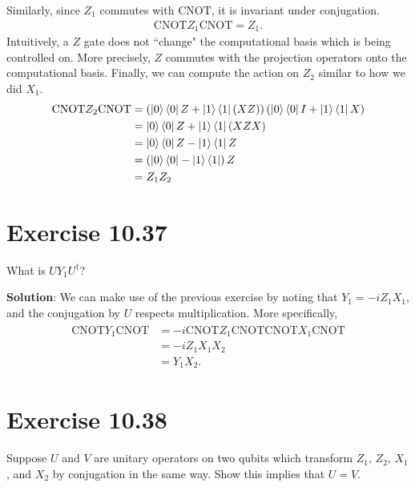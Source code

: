 \documentclass{book}
\begin{document}
    Similarly, since $Z_1$ commutes with $\mathrm{CNOT}$, it is invariant under conjugation.
    \begin{align}
        \mathrm{CNOT} Z_1 \mathrm{CNOT} = Z_1.
    \end{align}
    Intuitively, a $Z$ gate does not ``change" the computational basis which is being controlled on. More precisely, $Z$ commutes with the projection operators onto the computational basis. Finally, we can compute the action on $Z_2$ similar to how we did $X_1$.
    \begin{align}
    \begin{aligned}
        \mathrm{CNOT} Z_2 \mathrm{CNOT} &= \left(\ket{0}\bra{0}Z + \ket{1}\bra{1}(XZ)\right)\left(\ket{0}\bra{0}I + \ket{1}\bra{1}X\right) \\
        &= \ket{0}\bra{0}Z + \ket{1}\bra{1}(XZX) \\
        &= \ket{0}\bra{0}Z -\ket{1}\bra{1}Z \\
        &= \left(\ket{0}\bra{0}-\ket{1}\bra{1}\right) Z \\
        &= Z_1 Z_2
    \end{aligned}
    \end{align}
    
\section*{Exercise 10.37}
    What is $U Y_1 U^{\dagger}$?
    
    \textbf{Solution}: We can make use of the previous exercise by noting that $Y_1 = -i Z_1 X_1$, and the conjugation by $U$ respects multiplication. More specifically,
    \begin{align}
    \begin{aligned}
        \mathrm{CNOT}Y_1 \mathrm{CNOT} &= -i \mathrm{CNOT}Z_1 \mathrm{CNOT} \mathrm{CNOT} X_1 \mathrm{CNOT} \\
        &=-i Z_1 X_1 X_2 \\
        &=Y_1 X_2.
    \end{aligned}
    \end{align}
    
\section*{Exercise 10.38}
    Suppose $U$ and $V$ are unitary operators on two qubits which transform $Z_1$, $Z_2$, $X_1$, and $X_2$ by conjugation in the same way. Show this implies that $U = V$.
    
\end{document}
